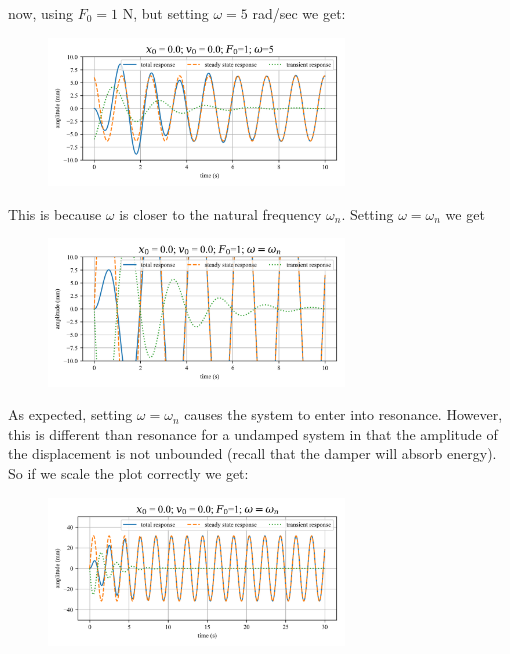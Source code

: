 \documentclass[12pt,letter]{article}
\numberwithin{ex}{section} %
\numberwithin{re}{section} %
\begin{document}
			\noindent now, using $F_0=1$ N, but setting $\omega=5$ rad/sec we get:
			\begin{figure}[H]
				\centering
				\includegraphics[width=0.7\textwidth]{../Figures/example_1_3.png}
			\end{figure}				
			\noindent This is because $\omega$ is closer to the natural frequency $\omega_n$. Setting $\omega=\omega_n$ we get
			\begin{figure}[H]
				\centering
				\includegraphics[width=0.7\textwidth]{../Figures/example_1_4.png}
			\end{figure}			
			As expected, setting $\omega=\omega_n$ causes the system to enter into resonance. However, this is different than resonance for a undamped system in that the amplitude of the displacement is not unbounded (recall that the damper will absorb energy). So if we scale the plot correctly we get: 
			\begin{figure}[H]
				\centering
				\includegraphics[width=0.7\textwidth]{../Figures/example_1_5.png}
			\end{figure}
			
\end{document}
